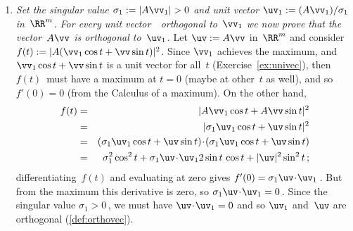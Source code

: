 \begin{enumerate}
\item \emph{Set the singular value \(\sigma_1:=|A\vv_1|>0\) and unit vector \(\uv_1:=(A\vv_1)/\sigma_1\) in~\(\RR^m\). 
For every unit vector~\vv\ orthogonal to~\(\vv_1\) we now prove that the vector~\(A\vv\) is orthogonal to~\(\uv_1\).}
Let \(\uv:=A\vv\) in~\(\RR^m\) and consider \(f(t):=|A(\vv_1\cos t+\vv\sin t)|^2\).
Since \(\vv_1\) achieves the maximum, and \(\vv_1\cos t+\vv\sin t\) is a unit vector for all~\(t\) (Exercise~\ref{ex:univec}), then \(f(t)\)~must have a maximum at \(t=0\) (maybe at other~\(t\) as well), and so \(f'(0)=0\) (from the Calculus of a maximum).
On the other hand, 
\begin{eqnarray*}
f(t)&=&|A\vv_1\cos t+A\vv\sin t|^2
\\&=&|\sigma_1\uv_1\cos t+\uv\sin t|^2
\\&=&(\sigma_1\uv_1\cos t+\uv\sin t)\cdot(\sigma_1\uv_1\cos t+\uv\sin t)
\\&=&\sigma_1^2\cos^2 t+\sigma_1\uv\cdot\uv_12\sin t\,\cos t+|\uv|^2\sin^2 t
\,;
\end{eqnarray*}
differentiating~\(f(t)\) and evaluating at zero gives
\(f'(0)=\sigma_1\uv\cdot\uv_1\)\,.
But from the maximum this derivative is zero, so \(\sigma_1\uv\cdot\uv_1=0\)\,.
Since the singular value \(\sigma_1>0\)\,, we must have \(\uv\cdot\uv_1=0\) and so \(\uv_1\) and~\(\uv\) are orthogonal (\autoref{def:orthovec}).


\end{enumerate}
